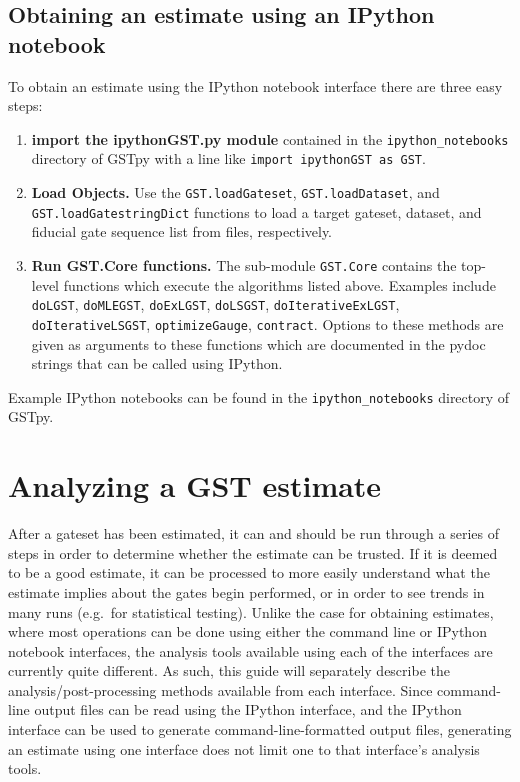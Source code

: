 \documentclass{article}[11pt]
\begin{document}
\subsection{Obtaining an estimate using an IPython notebook\label{secEstimateUsingIPython}}
To obtain an estimate using the IPython notebook interface there are three easy steps:
\begin{enumerate}
\item \textbf{import the ipythonGST.py module} contained in the \texttt{ipython\_notebooks} directory of GSTpy with a line like \texttt{import ipythonGST as GST}.
\item \textbf{Load Objects.}  Use the \texttt{GST.loadGateset}, \texttt{GST.loadDataset}, and \texttt{GST.loadGatestringDict} functions to load a target gateset, dataset, and fiducial gate sequence list from files, respectively.
\item \textbf{Run GST.Core functions.}  The sub-module \texttt{GST.Core} contains the top-level functions which execute the algorithms listed above.  Examples include \texttt{doLGST}, \texttt{doMLEGST}, \texttt{doExLGST}, \texttt{doLSGST}, \texttt{doIterativeExLGST}, \texttt{doIterativeLSGST}, \texttt{optimizeGauge}, \texttt{contract}.  Options to these methods are given as arguments to these functions which are documented in the pydoc strings that can be called using IPython.
\end{enumerate}
Example IPython notebooks can be found in the \texttt{ipython\_notebooks} directory of GSTpy.

\section{Analyzing a GST estimate\label{secAnalysis}}
After a gateset has been estimated, it can and should be run through a series of steps in order to determine whether the estimate can be trusted.  If it is deemed to be a good estimate, it can be processed to more easily understand what the estimate implies about the gates begin performed, or in order to see trends in many runs (e.g.~for statistical testing).  Unlike the case for obtaining estimates, where most operations can be done using either the command line or IPython notebook interfaces, the analysis tools available using each of the interfaces are currently quite different.  As such, this guide will separately describe the analysis/post-processing methods available from each interface.  Since command-line output files can be read using the IPython interface, and the IPython interface can be used to generate command-line-formatted output files, generating an estimate using one interface does not limit one to that interface's analysis tools.
\end{document}
